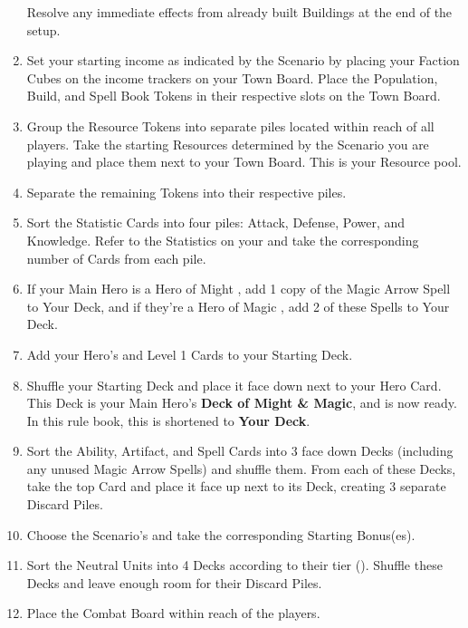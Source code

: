 \begin{multicols*}{2}
\begin{enumerate}
    Resolve any immediate effects from already built Buildings at the end of the setup.
  \item Set your starting income as indicated by the Scenario by placing your Faction Cubes on the income trackers on your Town Board.
    Place the Population, Build, and Spell Book Tokens in their respective slots on the Town Board.
  \item Group the Resource Tokens into separate piles located within reach of all players.
    Take the starting Resources determined by the Scenario you are playing and place them next to your Town Board.
    This is your Resource pool.
  \item Separate the remaining Tokens into their respective piles.
  \item Sort the Statistic Cards into four piles: Attack, Defense, Power, and Knowledge.
    Refer to the Statistics on your  and take the corresponding number of Cards from each pile.
  \item If your Main Hero is a Hero of Might , add 1 copy of the Magic Arrow Spell to Your Deck, and if they’re a Hero of Magic , add 2 of these Spells to Your Deck.
  \item Add your Hero's  and Level 1  Cards to your Starting Deck.
  \item Shuffle your Starting Deck and place it face down next to your Hero Card.
    This Deck is your Main Hero's \textbf{Deck of Might \& Magic}, and is now ready. In this rule book, this is shortened to \textbf{Your Deck}.
  \item Sort the Ability, Artifact, and Spell Cards into 3 face down Decks (including any unused Magic Arrow Spells) and shuffle them.
    From each of these Decks, take the top Card and place it face up next to its Deck, creating 3 separate Discard Piles.
  \item Choose the Scenario's  and take the corresponding Starting Bonus(es).
  \item Sort the Neutral Units into 4 Decks according to their tier ().
    Shuffle these Decks and leave enough room for their Discard Piles.
  \item Place the Combat Board within reach of the players.

\end{enumerate}
\end{multicols*}
